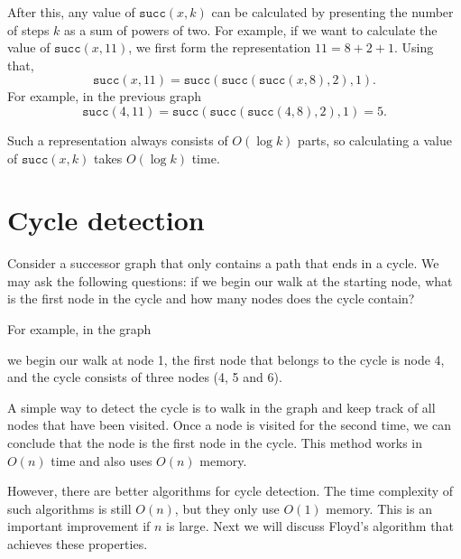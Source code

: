 After this, any value of $\texttt{succ}(x,k)$ can be calculated
by presenting the number of steps $k$ as a sum of powers of two.
For example, if we want to calculate the value of $\texttt{succ}(x,11)$,
we first form the representation $11=8+2+1$.
Using that,
\[\texttt{succ}(x,11)=\texttt{succ}(\texttt{succ}(\texttt{succ}(x,8),2),1).\]
For example, in the previous graph
\[\texttt{succ}(4,11)=\texttt{succ}(\texttt{succ}(\texttt{succ}(4,8),2),1)=5.\]

Such a representation always consists of
$O(\log k)$ parts, so calculating a value of $\texttt{succ}(x,k)$
takes $O(\log k)$ time.

\section{Cycle detection}


Consider a successor graph that only contains
a path that ends in a cycle.
We may ask the following questions:
if we begin our walk at the starting node,
what is the first node in the cycle
and how many nodes does the cycle contain?

For example, in the graph

\begin{center}
\end{center}
we begin our walk at node 1,
the first node that belongs to the cycle is node 4, and the cycle consists
of three nodes (4, 5 and 6).

A simple way to detect the cycle is to walk in the
graph and keep track of
all nodes that have been visited. Once a node is visited
for the second time, we can conclude
that the node is the first node in the cycle.
This method works in $O(n)$ time and also uses
$O(n)$ memory.

However, there are better algorithms for cycle detection.
The time complexity of such algorithms is still $O(n)$,
but they only use $O(1)$ memory.
This is an important improvement if $n$ is large.
Next we will discuss Floyd's algorithm that
achieves these properties.

